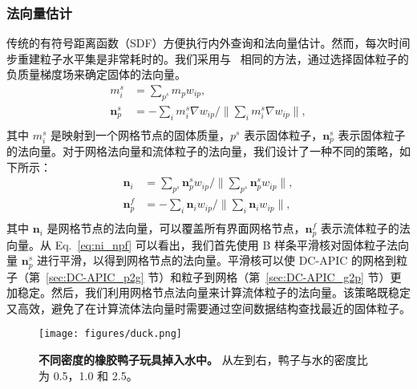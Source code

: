 \subsubsection{法向量估计}
传统的有符号距离函数（SDF）方便执行内外查询和法向量估计。然而，每次时间步重建粒子水平集是非常耗时的。我们采用与~\cite{fang2020iq} 相同的方法，通过选择固体粒子的负质量梯度场来确定固体的法向量。
\begin{equation}
\begin{aligned}
m_i^s &= \sum_{p^s} m_p w_{ip},\\
\mathbf{n}_p^s &= -\sum_i m_i^s \nabla w_{ip} / \| \sum_i m_i^s \nabla w_{ip} \| ,\\
\end{aligned}
\end{equation}
其中 $m_i^s$ 是映射到一个网格节点的固体质量，$p^s$ 表示固体粒子，$\mathbf{n}_p^s$ 表示固体粒子的法向量。对于网格法向量和流体粒子的法向量，我们设计了一种不同的策略，如下所示：
\begin{equation}
\label{eq:ni_npf}
\begin{aligned}
\mathbf{n}_i &= \sum_{p^s} \mathbf{n}_p^s w_{ip} / \| \sum_{p^s} \mathbf{n}_p^s w_{ip} \| ,\\
\mathbf{n}_p^f &= -\sum_i \mathbf{n}_i w_{ip} / \| \sum_i \mathbf{n}_i w_{ip} \|,\\
\end{aligned}
\end{equation}
其中 $\mathbf{n}_i$ 是网格节点的法向量，可以覆盖所有界面网格节点，$\mathbf{n}_p^f$ 表示流体粒子的法向量。从 Eq.~\eqref{eq:ni_npf} 可以看出，我们首先使用 B 样条平滑核对固体粒子法向量 $\mathbf{n}_p^s$ 进行平滑，以得到网格节点的法向量。平滑核可以使 DC-APIC 的网格到粒子（第~\ref{sec:DC-APIC_p2g} 节）和粒子到网格（第~\ref{sec:DC-APIC_g2p} 节）更加稳定。然后，我们利用网格节点法向量来计算流体粒子的法向量。该策略既稳定又高效，避免了在计算流体法向量时需要通过空间数据结构查找最近的固体粒子。

\begin{figure}[htbp]
    \centering
    \texttt{[image: figures/duck.png]}
    \caption{\textbf{不同密度的橡胶鸭子玩具掉入水中。} 从左到右，鸭子与水的密度比为 0.5，1.0 和 2.5。}
    \label{fig:duck}
\end{figure}